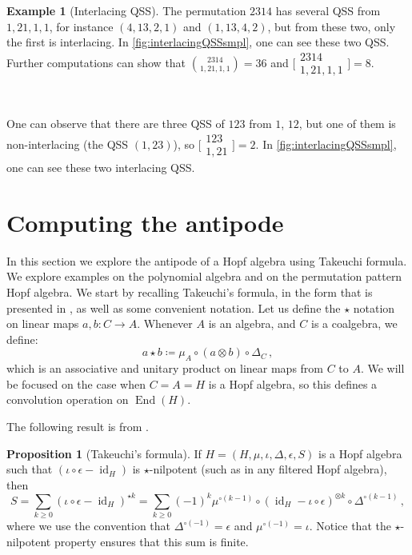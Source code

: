 \documentclass[12pt, reqno]{amsart}
\theoremstyle{definition}
\newtheorem{prop}[thm]{Proposition}
\newtheorem{smpl}[thm]{Example}
\DeclareMathOperator{\id}{id}
\DeclareMathOperator{\End}{\mathrm{End}}
\begin{document}
\begin{smpl}[Interlacing QSS]
The permutation $2314$ has several QSS from $1, 21, 1, 1$, for instance $(4, 13, 2, 1)$ and $(1, 13, 4, 2)$, but from these two, only the first is interlacing.
In \cref{fig:interlacingQSSsmpl}, one can see these two QSS.
Further computations can show that $\binom{2314}{1, 21, 1, 1} = 36$ and $\bigl[\!\begin{smallmatrix} 2314 \\ 1, 21, 1, 1 \end{smallmatrix}\!\bigr] = 8$.

\

One can observe that there are three QSS of $123$ from $1$, $12$, but one of them is non-interlacing (the QSS $(1,23)$), so
$\bigl[\!\begin{smallmatrix} 123 \\ 1, 21 \end{smallmatrix}\!\bigr] = 2$.
In \cref{fig:interlacingQSSsmpl}, one can see these two interlacing QSS.
\end{smpl}


\section{Computing the antipode\label{sec:antipode_computing}}

In this section we explore the antipode of a Hopf algebra using Takeuchi formula.
We explore examples on the polynomial algebra and on the permutation pattern Hopf algebra.
We start by recalling Takeuchi's formula, in the form that is presented in \cite{GrinbergReiner}, as well as some convenient notation.
Let us define the $\star$ notation on linear maps $a, b: C \to A$.
Whenever $A$ is an algebra, and $C$ is a coalgebra, we define:
$$a \star b \coloneqq \mu_A \circ (a \otimes b) \circ \Delta_C\, ,$$
which is an associative and unitary product on linear maps from $C$ to $A$. We will be focused on the case when $C=A=H$ is a Hopf algebra, so this defines a convolution operation on $\End(H)$.

The following result is from \cite[Lemma 14]{Takeuchi1971}.

\begin{prop}[Takeuchi's formula]\label{lm:takeuchi}
If $H = (H, \mu, \iota, \Delta, \epsilon, S)$ is a Hopf algebra such that $(\iota\circ \epsilon - \id_H)$ is $\star$-nilpotent (such as in any filtered Hopf algebra), then 
\begin{equation}\label{eq:eq1}
S = \sum_{k\geq 0 }  ( \iota  \circ\epsilon- \id_H)^{\star k} = \sum_{k\geq 0} (-1)^k \mu^{\circ (k-1)} \circ (\id_{H} - \iota \circ \epsilon)^{\otimes k} \circ \Delta^{\circ (k-1)}\, ,
\end{equation}
where we use the convention that $\Delta^{\circ (-1)} = \epsilon $ and $\mu^{\circ (-1)} = \iota$.
Notice that the $\star$-nilpotent property ensures that this sum is finite.
\end{prop}
\end{document}
